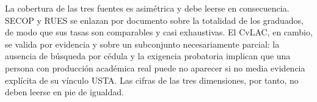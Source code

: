 \begin{cajaobs}
La cobertura de las tres fuentes es asimétrica y debe leerse en consecuencia. SECOP y RUES se enlazan por documento sobre la totalidad de los graduados, de modo que sus tasas son comparables y casi exhaustivas. El CvLAC, en cambio, se valida por evidencia y sobre un subconjunto necesariamente parcial: la ausencia de búsqueda por cédula y la exigencia probatoria implican que una persona con producción académica real puede no aparecer si no media evidencia explícita de su vínculo USTA. Las cifras de las tres dimensiones, por tanto, no deben leerse en pie de igualdad.
\end{cajaobs}
